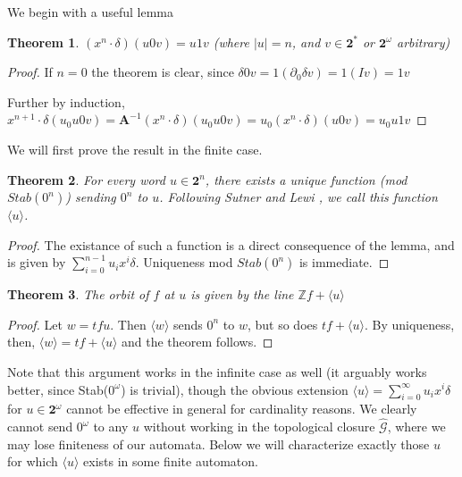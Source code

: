 \documentclass[12pt]{article}
\newcommand{\G}{\mathcal{G}}
\newcommand{\Z}{\mathbb{Z}}
\newcommand{\2}{\textbf{2}}
\newcommand{\Am}{\textbf{A}}
\newcommand{\del}{\partial}
\newtheorem{thm}{Theorem}
\begin{document}
We begin with a useful lemma

\begin{thm}
  $(x^n \cdot \delta) (u0v) = u1v$ 
  (where $|u| = n$, and $v \in \2^*$ or $\2^\omega$ arbitrary)
\end{thm}

\begin{proof}
  If $n=0$ the theorem is clear, since 
  $\delta 0v = 1 (\del_0 \delta v) = 1 (I v) = 1v$

  Further by induction, 
  $x^{n+1} \cdot \delta (u_0u0v) = 
  \Am^{-1} (x^n \cdot \delta) (u_0u0v) =
  u_0 (x^n \cdot \delta) (u0v) =
  u_0u1v$
\end{proof}

We will first prove the result in the finite case.

\begin{thm}
  For every word $u \in \2^n$, there exists a unique function
  (mod $Stab(0^n)$) sending $0^n$ to $u$. Following Sutner and Lewi
  \cite{SutnerLewi12:iter_inver_bin_trans}, we call this function
  $\langle u \rangle$.
\end{thm}

\begin{proof}
  The existance of such a function is a direct consequence of the lemma,
  and is given by $\sum_{i=0}^{n-1} u_i x^i \delta$.
  Uniqueness mod $Stab(0^n)$ is immediate.
\end{proof}

\begin{thm}
  The orbit of $f$ at $u$ is given by the line $\Z f + \langle u \rangle$
\end{thm}

\begin{proof}
  Let $w = tf u$. Then $\langle w \rangle$ sends $0^n$ to $w$, 
  but so does $tf + \langle u \rangle$. By uniqueness, then,
  $\langle w \rangle = tf + \langle u \rangle$ and the theorem follows.
\end{proof}

Note that this argument works in the infinite case as well 
(it arguably works better, since Stab($0^\omega$) is trivial), though
the obvious extension $\langle u \rangle = \sum_{i=0}^{\infty} u_i x^i \delta$ 
for $u \in \2^\omega$ cannot be effective in general for cardinality reasons. 
We clearly cannot send $0^\omega$ to any $u$ without working in the 
topological closure $\widehat{\G}$, where we may lose finiteness of our 
automata. Below we will characterize exactly those $u$ for which 
$\langle u \rangle$ exists in some finite automaton.
\end{document}
